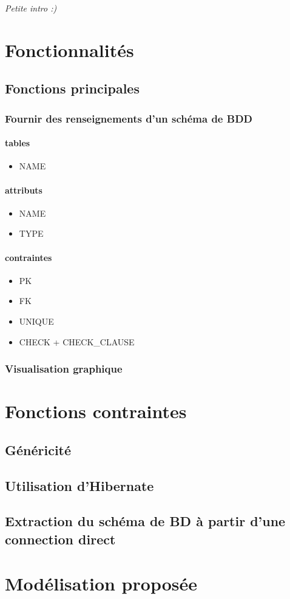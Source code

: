 \textit{Petite intro :)}

\section{Fonctionnalités}
	\subsection{Fonctions principales}
		\subsubsection{Fournir des renseignements d'un schéma de BDD}
			\paragraph{tables}
				\begin{itemize}
					\item NAME
				\end{itemize}
			\paragraph{attributs}
				\begin{itemize}
					\item NAME
					\item TYPE
				\end{itemize}
			\paragraph{contraintes}
				\begin{itemize}
					\item PK
					\item FK
					\item UNIQUE
			  	\item CHECK + CHECK_CLAUSE
				\end{itemize} 
		\subsubsection{Visualisation graphique}

\section{Fonctions contraintes}
	\subsection{Généricité}
	\subsection{Utilisation d'Hibernate}
	\subsection{Extraction du schéma de BD à partir d'une connection direct} %

\section{Modélisation proposée}